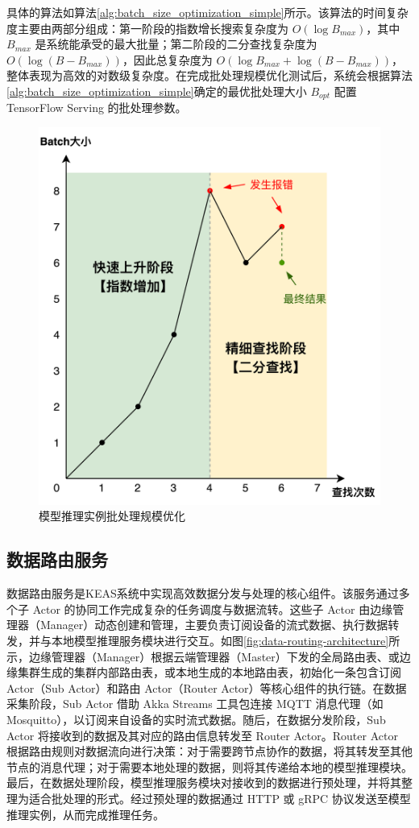 具体的算法如算法\ref{alg:batch_size_optimization_simple}所示。该算法的时间复杂度主要由两部分组成：第一阶段的指数增长搜索复杂度为 $O(\log B_{max})$，其中 $B_{max}$ 是系统能承受的最大批量；第二阶段的二分查找复杂度为 $O(\log(B - B_{max}))$，因此总复杂度为 $O(\log B_{max} + \log(B - B_{max}))$，整体表现为高效的对数级复杂度。在完成批处理规模优化测试后，系统会根据算法\ref{alg:batch_size_optimization_simple}确定的最优批处理大小 $B_{opt}$ 配置 TensorFlow Serving 的批处理参数。

\begin{figure}[ht]
  \centering
  \includegraphics[width=0.6\linewidth]{pics/4-14批查找过程.png}
  \caption{模型推理实例批处理规模优化}
  \label{fig:4-14batch}
\end{figure}

\subsection{数据路由服务}

数据路由服务是KEAS系统中实现高效数据分发与处理的核心组件。该服务通过多个子 Actor 的协同工作完成复杂的任务调度与数据流转。这些子 Actor 由边缘管理器（Manager）动态创建和管理，主要负责订阅设备的流式数据、执行数据转发，并与本地模型推理服务模块进行交互。如图\ref{fig:data-routing-architecture}所示，边缘管理器（Manager）根据云端管理器（Master）下发的全局路由表、或边缘集群生成的集群内部路由表，或本地生成的本地路由表，初始化一条包含订阅 Actor（Sub Actor）和路由 Actor（Router Actor）等核心组件的执行链。在数据采集阶段，Sub Actor 借助 Akka Streams 工具包连接 MQTT 消息代理（如 Mosquitto），以订阅来自设备的实时流式数据。随后，在数据分发阶段，Sub Actor 将接收到的数据及其对应的路由信息转发至 Router Actor。Router Actor 根据路由规则对数据流向进行决策：对于需要跨节点协作的数据，将其转发至其他节点的消息代理；对于需要本地处理的数据，则将其传递给本地的模型推理模块。最后，在数据处理阶段，模型推理服务模块对接收到的数据进行预处理，并将其整理为适合批处理的形式。经过预处理的数据通过 HTTP 或 gRPC 协议发送至模型推理实例，从而完成推理任务。

